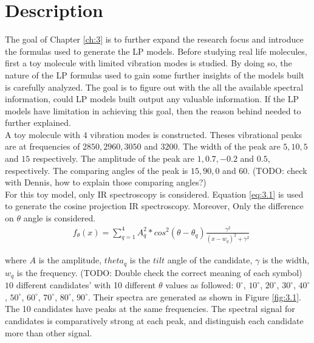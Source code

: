  \label{ch:3}

\section{Description}
The goal of Chapter \ref{ch:3} is to further expand the research focus and introduce the formulas used to generate the LP models. Before studying real life molecules, first a toy molecule with limited vibration modes is studied. By doing so, the nature of the LP formulas used to gain some further insights of the models built is carefully analyzed. The goal is to figure out with the all the available spectral information, could LP models built output any valuable information. If the LP models have limitation in achieving this goal, then the reason behind needed to further explained. \\

A toy molecule with $4$ vibration modes is constructed. Theses vibrational peaks are at frequencies of $2850, 2960, 3050$ and $3200$. The width of the peak are $5, 10, 5$ and $15$ respectively. The amplitude of the peak are $1, 0.7, -0.2$ and $0.5$, respectively. The comparing angles of the peak is $15, 90, 0$ and $60$. (TODO: check with Dennis, how to explain those comparing angles?)  \\

For this toy model, only IR spectroscopy is considered. Equation \ref{eq:3.1} is used to generate the cosine projection IR spectroscopy. Moreover, Only the difference on $\theta$ angle is considered. \\

\begin{eqnarray} \label{eq:3.1}
& f_{\theta}(x) = \displaystyle\sum^{4}_{q=1} A_q^2 * cos^2(\theta - \theta_q)\frac{\gamma^2}{(x- w_q)^2 + \gamma^2} 
\end{eqnarray}

where $A$ is the amplitude, $theta_{q}$ is the $tilt$ angle of the candidate, $\gamma$ is the width, $w_q$ is the frequency. (TODO: Double check the correct meaning of each symbol) $10$ different candidates' with 10 different $\theta$ values as followed: $0^{\circ}$, $10^{\circ}$, $20^{\circ}$, $30^{\circ}$, $40^{\circ}$, $50^{\circ}$, $60^{\circ}$, $70^{\circ}$, $80^{\circ}$, $90^{\circ}$. Their spectra are generated as shown in Figure \ref{fig:3.1}. The 10 candidates have peaks at the same frequencies. The spectral signal for candidates is comparatively strong at each peak, and distinguish each candidate more than other signal. \\


